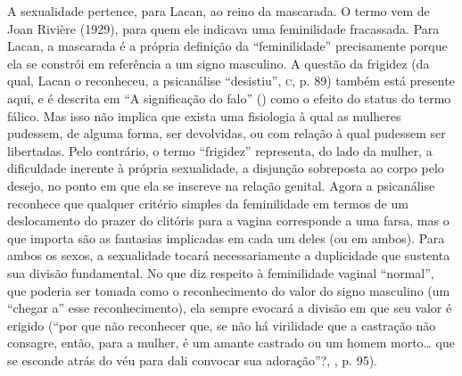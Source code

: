 A sexualidade pertence, para Lacan, ao reino da mascarada. O termo vem
de Joan Rivière (1929), para quem ele indicava uma feminilidade
fracassada. Para Lacan, a mascarada é a própria definição da
``feminilidade'' precisamente porque ela se constrói em referência a um
signo masculino. A questão da frigidez (da qual, Lacan o reconheceu, a
psicanálise ``desistiu'', \textsc{c}, p. 89) também está presente aqui, e é
descrita em ``A significação do falo'' () como o efeito do status do
termo fálico. Mas isso não implica que exista uma fisiologia à qual as
mulheres pudessem, de alguma forma, ser devolvidas, ou com relação à
qual pudessem ser libertadas. Pelo contrário, o termo ``frigidez''
representa, do lado da mulher, a dificuldade inerente à própria
sexualidade, a disjunção sobreposta ao corpo pelo desejo, no ponto em
que ela se inscreve na relação genital. Agora a psicanálise reconhece
que qualquer critério simples da feminilidade em termos de um
deslocamento do prazer do clitóris para a vagina corresponde a uma
farsa, mas o que importa são as fantasias implicadas em cada um deles
(ou em ambos). Para ambos os sexos, a sexualidade tocará necessariamente
a duplicidade que sustenta sua divisão fundamental. No que diz respeito
à feminilidade vaginal ``normal'', que poderia ser tomada como o
reconhecimento do valor do signo masculino (um ``chegar a'' esse
reconhecimento), ela sempre evocará a divisão em que seu valor é erigido
(``por que não reconhecer que, se não há virilidade que a castração não
consagre, então, para a mulher, é um amante castrado ou um homem
morto\ldots{} que se esconde atrás do véu para dali convocar sua adoração''?,
, p. 95).

